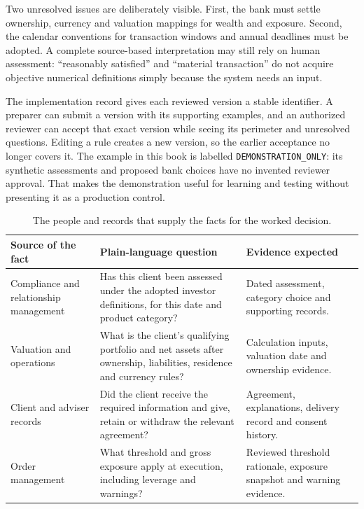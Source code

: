 Two unresolved issues are deliberately visible. First, the bank must settle
ownership, currency and valuation mappings for wealth and exposure. Second,
the calendar conventions for transaction windows and annual deadlines must be
adopted. A complete source-based interpretation may still rely on human
assessment: ``reasonably satisfied'' and ``material transaction'' do not acquire
objective numerical definitions simply because the system needs an input.

The implementation record gives each reviewed version a stable identifier. A
preparer can submit a version with its supporting examples, and an authorized
reviewer can accept that exact version while seeing its perimeter and unresolved
questions. Editing a rule creates a new version, so the earlier acceptance no
longer covers it. The example in this book is labelled
\texttt{DEMONSTRATION\_ONLY}: its synthetic assessments and proposed bank
choices have no invented reviewer approval. That makes the demonstration useful
for learning and testing without presenting it as a production control.


\begin{table}[htbp]
\centering
\caption{The people and records that supply the facts for the worked decision.}
\label{tab:demo-inputs-summary}
\begin{tabularx}{0.96\textwidth}{P{0.27\textwidth}P{0.39\textwidth}Y}
\toprule
Source of the fact & Plain-language question & Evidence expected \\ \midrule
Compliance and relationship management & Has this client been assessed under the adopted investor definitions, for this date and product category? & Dated assessment, category choice and supporting records. \\
Valuation and operations & What is the client's qualifying portfolio and net assets after ownership, liabilities, residence and currency rules? & Calculation inputs, valuation date and ownership evidence. \\
Client and adviser records & Did the client receive the required information and give, retain or withdraw the relevant agreement? & Agreement, explanations, delivery record and consent history. \\
Order management & What threshold and gross exposure apply at execution, including leverage and warnings? & Reviewed threshold rationale, exposure snapshot and warning evidence. \\
\bottomrule
\end{tabularx}
\end{table}


